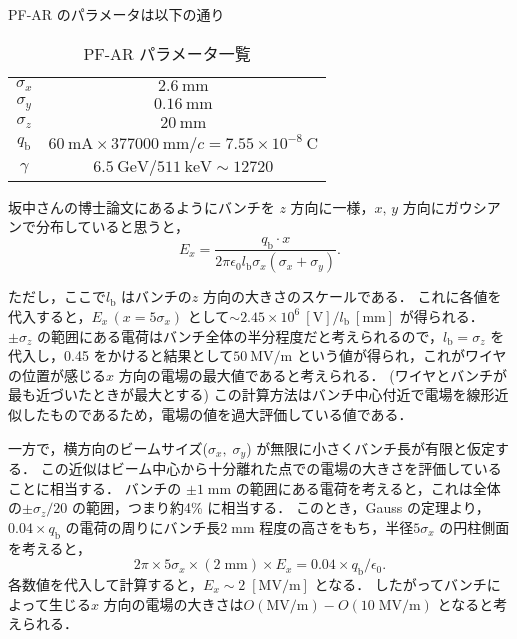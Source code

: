 \documentclass{jsarticle}
\begin{document}
PF-AR のパラメータは以下の通り
\begin{table}[h]
\centering
\caption{PF-AR パラメータ一覧\label{tab:pfarparameter}}
\begin{tabular}{cc} \hline
$\sigma_x$ & $2.6~\mathrm{mm}$ \\ 
$\sigma_y$ & $0.16~\mathrm{mm}$ \\ 
$\sigma_z$ & $20~\mathrm{mm}$ \\ 
$q_\mathrm{b}$ & $60~\mathrm{mA} \times 377000~\mathrm{mm}/c = 7.55 \times 10^{-8}~\mathrm{C}$ \\
$\gamma$ & $6.5~\mathrm{GeV}/511~\mathrm{keV} \sim 12720$ \\ \hline
\end{tabular}
\end{table}

坂中さんの博士論文にあるようにバンチを $z$ 方向に一様，$x,\,y$ 方向にガウシアンで分布していると思うと，
\begin{equation}
E_x = \frac{q_\mathrm{b} \cdot x}{2\pi \epsilon_0 l_\mathrm{b}\sigma_x(\sigma_x + \sigma_y)}.
\end{equation}

ただし，ここで$l_\mathrm{b}$ はバンチの$z$ 方向の大きさのスケールである．
これに各値を代入すると，$E_x\,(x = 5\sigma_x)$ として$\sim 2.45 \times 10^6~[\mathrm{V}] /l_\mathrm{b}~[\mathrm{mm}]$ が得られる．
$\pm \sigma_z$ の範囲にある電荷はバンチ全体の半分程度だと考えられるので，$l_\mathrm{b} = \sigma_z$ を代入し，0.45 をかけると結果として$50~\mathrm{MV/m}$ という値が得られ，これがワイヤの位置が感じる$x$ 方向の電場の最大値であると考えられる．
(ワイヤとバンチが最も近づいたときが最大とする)
この計算方法はバンチ中心付近で電場を線形近似したものであるため，電場の値を過大評価している値である．

一方で，横方向のビームサイズ($\sigma_x,\;\sigma_y$) が無限に小さくバンチ長が有限と仮定する．
この近似はビーム中心から十分離れた点での電場の大きさを評価していることに相当する．
バンチの $\pm 1\;\mathrm{mm}$ の範囲にある電荷を考えると，これは全体の$\pm \sigma_z/20$ の範囲，つまり約4\% に相当する．
このとき，Gauss の定理より，$0.04 \times q_\mathrm{b}$ の電荷の周りにバンチ長$2\;\mathrm{mm}$ 程度の高さをもち，半径$5\sigma_x$ の円柱側面を考えると，
\begin{equation}
2 \pi \times 5\sigma_x \times (2\;\mathrm{mm}) \times E_x = 0.04 \times q_\mathrm{b} / \epsilon_0.
\end{equation}
各数値を代入して計算すると，$E_x \sim 2\;[\mathrm{MV/m}]$ となる．
したがってバンチによって生じる$x$ 方向の電場の大きさは$O(\mathrm{MV/m}) - O(10\;\mathrm{MV/m})$ となると考えられる．
\end{document}
